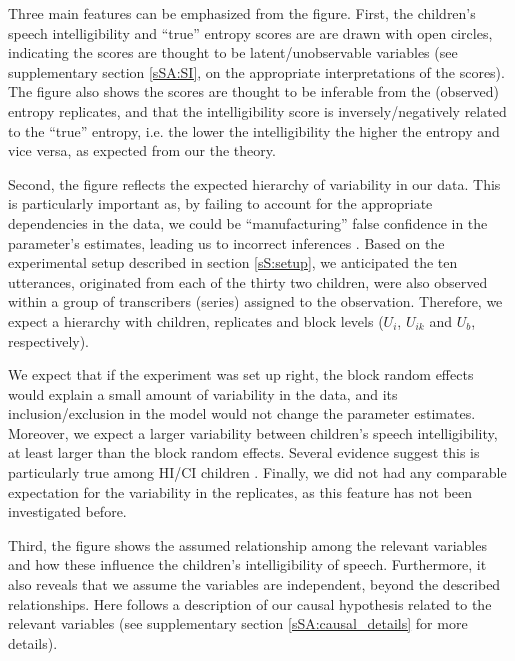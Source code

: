 Three main features can be emphasized from the figure. First, the children's speech intelligibility and ``true'' entropy scores are are drawn with open circles, indicating the scores are thought to be latent/unobservable variables \cite{Everitt_1984} (see supplementary section \ref{sSA:SI}, on the appropriate interpretations of the scores). The figure also shows the scores are thought to be inferable from the (observed) entropy replicates, and that the intelligibility score is inversely/negatively related to the ``true'' entropy, i.e. the lower the intelligibility the higher the entropy and vice versa, as expected from our the theory.

Second, the figure reflects the expected hierarchy of variability in our data. This is particularly important as, by failing to account for the appropriate dependencies in the data, we could be ``manufacturing'' false confidence in the parameter's estimates, leading us to incorrect inferences \cite{McElreath_2020}. Based on the experimental setup described in section \ref{sS:setup}, we anticipated the ten utterances, originated from each of the thirty two children, were also observed within a group of transcribers (series) assigned to the observation. Therefore, we expect a hierarchy with children, replicates and block levels ($U_{i}$, $U_{ik}$ and $U_{b}$, respectively).

We expect that if the experiment was set up right, the block random effects would explain a small amount of variability in the data, and its inclusion/exclusion in the model would not change the parameter estimates. Moreover, we expect a larger variability between children's speech intelligibility, at least larger than the block random effects. Several evidence suggest this is particularly true among HI/CI children \cite{Young_et_al_2002, Peng_et_al_2004, Montag_et_al_2014, Castellanos_et_al_2014, Yanbay_et_al_2014, Nittrouer_et_al_2014, Freeman_et_al_2017}. Finally, we did not had any comparable expectation for the variability in the replicates, as this feature has not been investigated before.

Third, the figure shows the assumed relationship among the relevant variables and how these influence the children's intelligibility of speech. Furthermore, it also reveals that we assume the variables are independent, beyond the described relationships. Here follows a description of our causal hypothesis related to the relevant variables (see supplementary section \ref{sSA:causal_details} for more details).

